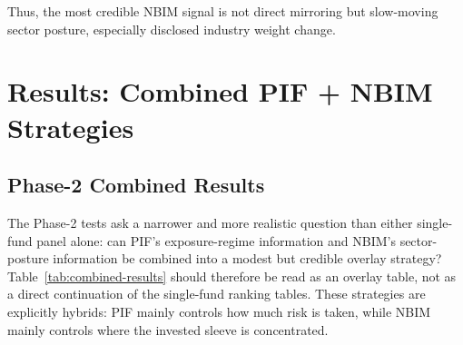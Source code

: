 \documentclass[conference]{IEEEtran}
\begin{document}
Thus, the most credible NBIM signal is not direct mirroring but slow-moving sector posture, especially disclosed industry weight change.

\section{Results: Combined PIF + NBIM Strategies}

\subsection{Phase-2 Combined Results}

The Phase-2 tests ask a narrower and more realistic question than either single-fund panel alone: can PIF's exposure-regime information and NBIM's sector-posture information be combined into a modest but credible overlay strategy? Table~\ref{tab:combined-results} should therefore be read as an overlay table, not as a direct continuation of the single-fund ranking tables. These strategies are explicitly hybrids: PIF mainly controls how much risk is taken, while NBIM mainly controls where the invested sleeve is concentrated.

\begin{table}[!t]
\caption{Combined PIF + NBIM Strategy Results}
\label{tab:combined-results}
\centering
\small
\setlength{\tabcolsep}{4pt}
\end{table}
\end{document}
